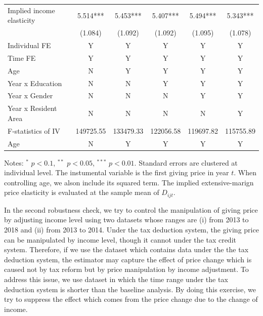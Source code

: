 \documentclass[ review  , 3p ]{elsarticle}
\begin{document}
\begin{table}
\begin{threeparttable}
\begin{tabular}[t]{lccccc}
  \hspace{1em}Implied income elasticity & 5.514*** & 5.453*** & 5.407*** & 5.494*** & 5.343***\\
  \hspace{1em} & (1.084) & (1.092) & (1.092) & (1.095) & (1.078)\\
  \hspace{1em}Individual FE & Y & Y & Y & Y & Y\\
  \hspace{1em}Time FE & Y & Y & Y & Y & Y\\
  \hspace{1em}Age & N & Y & Y & Y & \vphantom{1} Y\\
  \hspace{1em}Year x Education & N & N & Y & Y & Y\\
  \hspace{1em}Year x Gender & N & N & N & Y & Y\\
  \hspace{1em}Year x Resident Area & N & N & N & N & Y\\
  \hspace{1em}F-statistics of IV & 149725.55 & 133479.33 & 122056.58 & 119697.82 & 115755.89\\
  \hspace{1em}Age & N & Y & Y & Y & Y\\
  \bottomrule
  \end{tabular}
  \begin{tablenotes}
  \item Notes: $^{*}$ $p < 0.1$, $^{**}$ $p < 0.05$, $^{***}$ $p < 0.01$. Standard errors are clustered at individual level. The instumental variable is the first giving price in year $t$. When controlling age, we alson include its squared term. The implied extensive-marign price elasticity is evaluated at the sample mean of $D_{ijt}$.
  \end{tablenotes}
  \end{threeparttable}
  \end{table}

  In the second robustness check, we try to control the manipulation of giving price by adjusting income level using two datasets whose ranges are (i) from 2013 to 2018 and (ii) from 2013 to 2014. Under the tax deduction system, the giving price can be manipulated by income level, though it cannot under the tax credit system. Therefore, if we use the dataset which contains data under the the tax deduction system, the estimator may capture the effect of price change which is caused not by tax reform but by price manipulation by income adjustment. To address this issue, we use dataset in which the time range under the tax deduction system is shorter than the baseline analysis. By doing this exercise, we try to suppress the effect which comes from the price change due to the change of income.
\end{document}
